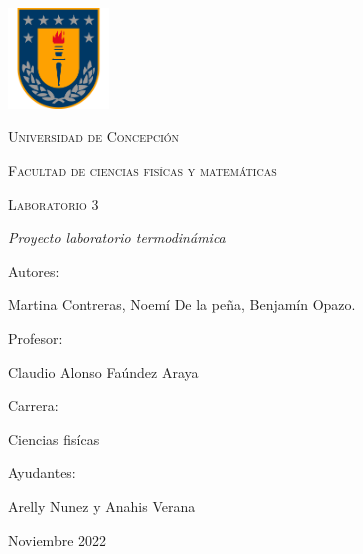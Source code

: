 \documentclass[a4paper, 12p]{article}
\begin{document}
\begin{titlepage}
      \begin{center}     
              
            \includegraphics[width=0.2\textwidth]{img/escudo_udec.png}                       %
            
            
            
            \vspace{1cm}
            \textsc{{\LARGE Universidad de Concepción}}
            
            \vspace{1cm}
            {\scshape\Large Facultad de ciencias fisícas y matemáticas \par}
            \vspace{2cm}
            {\scshape\Huge Laboratorio 3 \par}
            \vspace{2cm}
            {\itshape\Large Proyecto laboratorio termodinámica \par}
            \vfill
            {\Large Autores: \par}
            {\Large Martina Contreras, Noemí De la peña, Benjamín Opazo. \par}
            \vfill
            \vfill
            {\Large Profesor: \par}
            {\Large Claudio Alonso Faúndez Araya \par}
            \vfill
            \vfill
            {\Large Carrera: \par}
            {\Large Ciencias fisícas \par}
            \vfill
            \vfill
            {\Large Ayudantes: \par}
            {\Large Arelly Nunez y Anahis Verana \par}
            \vfill
            {\Large Noviembre 2022 \par}
      \end{center}
\end{titlepage}            
 

\tableofcontents
\newpage
\end{document}
